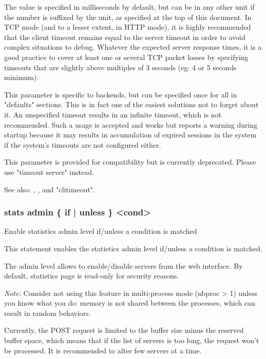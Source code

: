   The value is specified in milliseconds by default, but can be in any other
  unit if the number is suffixed by the unit, as specified at the top of this
  document. In TCP mode (and to a lesser extent, in HTTP mode), it is highly
  recommended that the client timeout remains equal to the server timeout in
  order to avoid complex situations to debug. Whatever the expected server
  response times, it is a good practice to cover at least one or several TCP
  packet losses by specifying timeouts that are slightly above multiples of 3
  seconds (eg: 4 or 5 seconds minimum).

  This parameter is specific to backends, but can be specified once for all in
  "defaults" sections. This is in fact one of the easiest solutions not to
  forget about it. An unspecified timeout results in an infinite timeout, which
  is not recommended. Such a usage is accepted and works but reports a warning
  during startup because it may results in accumulation of expired sessions in
  the system if the system's timeouts are not configured either.

  This parameter is provided for compatibility but is currently deprecated.
  Please use "timeout server" instead.

  See also: , ,  and
             "clitimeout".

\subsubsection[stats admin]{stats admin \{ if | unless \} <cond>}


  Enable statistics admin level if/unless a condition is matched


  This statement enables the statistics admin level if/unless a condition is
  matched.

  The admin level allows to enable/disable servers from the web interface. By
  default, statistics page is read-only for security reasons.

  \emph{Note:} Consider not using this feature in multi-process mode (nbproc > 1)
         unless you know what you do: memory is not shared between the
         processes, which can result in random behaviors.

  Currently, the POST request is limited to the buffer size minus the reserved
  buffer space, which means that if the list of servers is too long, the
  request won't be processed. It is recommended to alter few servers at a
  time.
  
